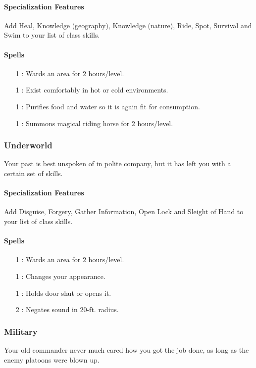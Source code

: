 \paragraph{Specialization Features}
Add Heal, Knowledge (geography), Knowledge (nature), Ride, Spot, Survival and Swim to your list of class skills.
\paragraph{Spells}
\begin{itemize}
 \item[1] : Wards an area for 2 hours/level.
 \item[1] : Exist comfortably in hot or cold environments.
 \item[1] : Purifies food and water so it is again fit for consumption.
 \item[1] : Summons magical riding horse for 2 hours/level.
\end{itemize}

\subsubsection{Underworld}
Your past is best unspoken of in polite company, but it has left you with a certain set of skills.
\paragraph{Specialization Features}
Add Disguise, Forgery, Gather Information, Open Lock and Sleight of Hand to your list of class skills.
\paragraph{Spells}
\begin{itemize}
 \item[1] : Wards an area for 2 hours/level.
 \item[1] : Changes your appearance.
 \item[1] : Holds door shut or opens it.
 \item[2] : Negates sound in 20-ft. radius.
\end{itemize}

\subsubsection{Military}
Your old commander never much cared how you got the job done, as long as the enemy platoons were blown up.
